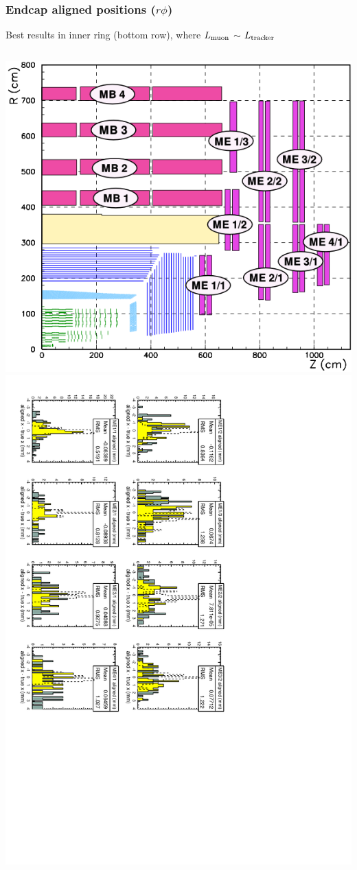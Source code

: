 \documentclass[compress]{beamer}
\begin{document}
\begin{frame}
\frametitle{Endcap aligned positions ($r\phi$)}
\small
Best results in inner ring (bottom row), where $L_{\mbox{\scriptsize muon}}$ $\sim$ $L_{\mbox{\scriptsize tracker}}$

\vfill
\begin{columns}
\includegraphics[width=\linewidth]{muon_system.png}
\includegraphics[height=\linewidth, angle=90]{muonhip_endcapx.pdf}
\end{columns}

\end{frame}
\end{document}

